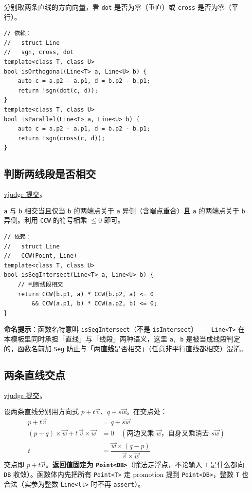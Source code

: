 		分别取两条直线的方向向量，看 \texttt{dot} 是否为零（垂直）或 \texttt{cross} 是否为零（平行）。

		\begin{verbatim}
// 依赖：
//   struct Line
//   sgn, cross, dot
template<class T, class U>
bool isOrthogonal(Line<T> a, Line<U> b) {
	auto c = a.p2 - a.p1, d = b.p2 - b.p1;
	return !sgn(dot(c, d));
}
template<class T, class U>
bool isParallel(Line<T> a, Line<U> b) {
	auto c = a.p2 - a.p1, d = b.p2 - b.p1;
	return !sgn(cross(c, d));
}
		\end{verbatim}

		\subsection{判断两线段是否相交}

		\href{https://vjudge.net/solution/64175810}{vjudge 提交}。

		\texttt{a} 与 \texttt{b} 相交当且仅当 \texttt{b} 的两端点关于 \texttt{a} 异侧（含端点重合）\textbf{且} \texttt{a} 的两端点关于 \texttt{b} 异侧。利用 \texttt{CCW} 的符号相乘 $\le 0$ 即可。

		\begin{verbatim}
// 依赖：
//   struct Line
//   CCW(Point, Line)
template<class T, class U>
bool isSegIntersect(Line<T> a, Line<U> b) {
	// 判断线段相交
	return CCW(b.p1, a) * CCW(b.p2, a) <= 0
	    && CCW(a.p1, b) * CCW(a.p2, b) <= 0;
}
		\end{verbatim}

		\textbf{命名提示}：函数名特意叫 \texttt{isSegIntersect}（不是 \texttt{isIntersect}）——\texttt{Line<T>} 在本模板里同时承担「直线」与「线段」两种语义，这里 \texttt{a, b} 是被当成线段判定的，函数名前加 \texttt{Seg} 防止与「两\textbf{直线}是否相交」（任意非平行直线都相交）混淆。

		\subsection{两条直线交点}

		\href{https://vjudge.net/solution/64186810}{vjudge 提交}。

		设两条直线分别用方向式 $p + t\vec{v}$、$q + s\vec{w}$。在交点处：
		\begin{align*}
			p + t\vec{v} &= q + s\vec{w} \\
			(p - q) \times \vec{w} + t\, \vec{v} \times \vec{w} &= 0 \quad (\text{两边叉乘 } \vec{w}\text{，自身叉乘消去 } s\vec{w}) \\
			t &= \dfrac{\vec{w} \times (q - p)}{\vec{v} \times \vec{w}}
		\end{align*}
		交点即 $p + t\vec{v}$。\textbf{返回值固定为 \texttt{Point<DB>}}（除法走浮点，不论输入 \texttt{T} 是什么都向 \texttt{DB} 收敛）。函数体内先把所有 \texttt{Point<T>} 走 promotion 提到 \texttt{Point<DB>}，整数 \texttt{T} 也合法（实参为整数 \texttt{Line<ll>} 时不再 \texttt{assert}）。

